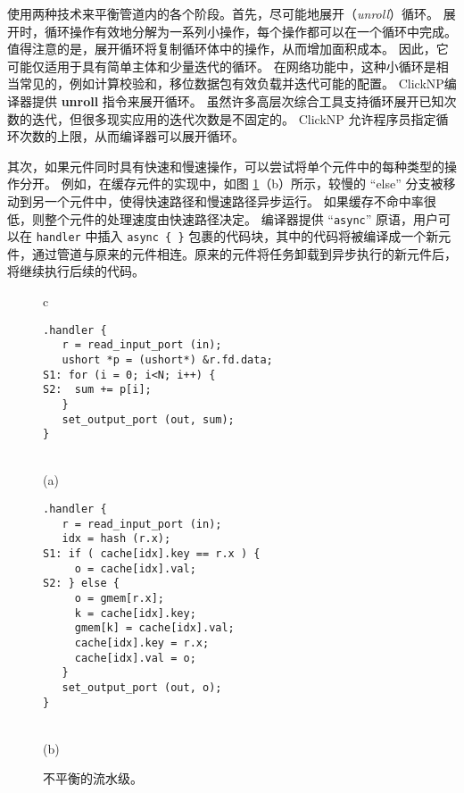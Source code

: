 \name 使用两种技术来平衡管道内的各个阶段。首先，尽可能地展开（\textit {unroll}）循环。
展开时，循环操作有效地分解为一系列小操作，每个操作都可以在一个循环中完成。
值得注意的是，展开循环将复制循环体中的操作，从而增加面积成本。
因此，它可能仅适用于具有简单主体和少量迭代的循环。
在网络功能中，这种小循环是相当常见的，例如计算校验和，移位数据包有效负载并迭代可能的配置。
ClickNP编译器提供 \textbf {unroll} 指令来展开循环。
虽然许多高层次综合工具支持循环展开已知次数的迭代，但很多现实应用的迭代次数是不固定的。
ClickNP 允许程序员指定循环次数的上限，从而编译器可以展开循环。

其次，如果元件同时具有快速和慢速操作，可以尝试将单个元件中的每种类型的操作分开。
例如，在缓存元件的实现中，如图 \ref {clicknp:fig:unbalance}（b）所示，较慢的 ``else'' 分支被移动到另一个元件中，使得快速路径和慢速路径异步运行。
如果缓存不命中率很低，则整个元件的处理速度由快速路径决定。
\name 编译器提供 ``\texttt{async}'' 原语，用户可以在 \texttt{handler} 中插入 \texttt{async \{ \}} 包裹的代码块，其中的代码将被编译成一个新元件，通过管道与原来的元件相连。原来的元件将任务卸载到异步执行的新元件后，将继续执行后续的代码。


\begin{figure}
\lstset{style=numbers}

\centering

\begin{tabular}{c}
{
\small
\begin{lstlisting}[escapechar=@]
.handler {
   r = read_input_port (in);
   ushort *p = (ushort*) &r.fd.data;
S1: for (i = 0; i<N; i++) {
S2:  sum += p[i];
   }
   set_output_port (out, sum);
}
\end{lstlisting} 
} \\
(a) \vspace{3pt} \\
{
\small 
\begin{lstlisting}[escapechar=@]
.handler {
   r = read_input_port (in);
   idx = hash (r.x);
S1: if ( cache[idx].key == r.x ) {
     o = cache[idx].val;
S2: } else {
     o = gmem[r.x];
     k = cache[idx].key;
     gmem[k] = cache[idx].val;
     cache[idx].key = r.x;
     cache[idx].val = o;
   }
   set_output_port (out, o);
}
\end{lstlisting} 
} \\
(b) \vspace{3pt} 
\end{tabular}

\caption{不平衡的流水级。}
\label{clicknp:fig:unbalance}

\end{figure}

